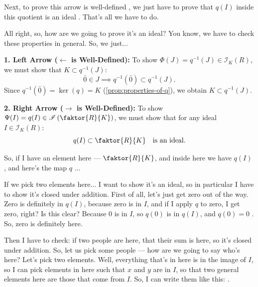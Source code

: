 \begin{proofWrapper}
\begin{speech}[00:23:35 - 00:25:06]
Next, to prove this arrow  is well-defined , we just have to prove that  $q(I)$ inside this quotient is an ideal . That's all we have to do.

All right, so, how are we going to prove it's an ideal? You know, we have to check these properties in general. So, we just...
\end{speech}

\begin{content}
\textbf{1. Left Arrow ($\longleftarrow$ is Well-Defined):}
To show $\Phi(J) = q^{-1}(J) \in \mathscr{I}_K(R)$, we must show that $K \subset q^{-1}(J)$:
\[
\bar{0} \in J \implies q^{-1}(\bar{0}) \subset q^{-1}(J).
\]
Since $q^{-1}(\bar{0}) = \ker(q) = K$ (\cref{prop:properties-of-q}), we obtain $K \subset q^{-1}(J)$.

\textbf{2. Right Arrow ($\longrightarrow$ is Well-Defined):}
To show $\Psi(I) = q(I) \in \mathscr{I}\left(\faktor{R}{K}\right)$, we must show that for any ideal $I \in \mathscr{I}_K(R)$:
\[
q(I) \subset \faktor{R}{K} \quad \text{is an ideal.}
\]
\end{content}

\begin{speech}[00:25:06 - 00:26:54]
So, if I have an element here  --- $\faktor{R}{K}$, and inside here we have $q(I)$ , and here's the map $q$ ...

If we pick two elements here... I want to show it's an ideal, so in particular I have to show it's closed under addition. First of all, let's just get zero out of the way. Zero is definitely in $q(I)$, because zero is in $I$, and if I apply $q$ to zero, I get zero, right?  Is this clear? Because $0$ is in $I$, so $q(0)$ is in $q(I)$, and $q(0) = 0$ . So, zero is definitely here.

Then I have to check: if two people are here, that their sum is here, so it's closed under addition. So, let us pick some people --- how are we going to say who's here? Let's pick two elements. Well, everything that's in here is in the image of $I$, so I can pick elements in here such that $x$ and $y$ are in $I$, so that two general elements here are those that come from $I$. So, I can write them like this: .


\end{speech}
\end{proofWrapper}
